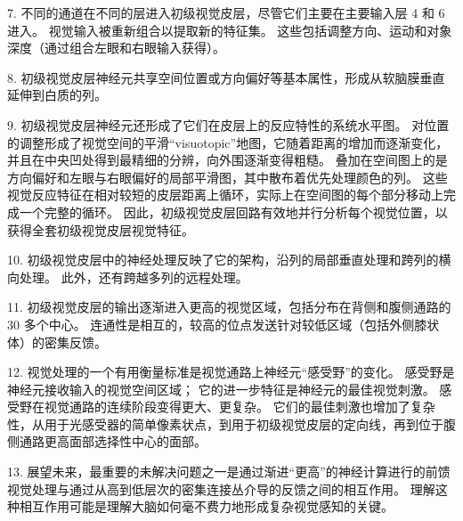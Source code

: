 7. 不同的通道在不同的层进入初级视觉皮层，尽管它们主要在主要输入层 4 和 6 进入。
视觉输入被重新组合以提取新的特征集。
这些包括调整方向、运动和对象深度（通过组合左眼和右眼输入获得）。
 

8. 初级视觉皮层神经元共享空间位置或方向偏好等基本属性，形成从软脑膜垂直延伸到白质的列。
 


9. 初级视觉皮层神经元还形成了它们在皮层上的反应特性的系统水平图。
对位置的调整形成了视觉空间的平滑“visuotopic”地图，它随着距离的增加而逐渐变化，并且在中央凹处得到最精细的分辨，向外围逐渐变得粗糙。
叠加在空间图上的是方向偏好和左眼与右眼偏好的局部平滑图，其中散布着优先处理颜色的列。
这些视觉反应特征在相对较短的皮层距离上循环，实际上在空间图的每个部分移动上完成一个完整的循环。
因此，初级视觉皮层回路有效地并行分析每个视觉位置，以获得全套初级视觉皮层视觉特征。 


10. 初级视觉皮层中的神经处理反映了它的架构，沿列的局部垂直处理和跨列的横向处理。
此外，还有跨越多列的远程处理。


11. 初级视觉皮层的输出逐渐进入更高的视觉区域，包括分布在背侧和腹侧通路的 30 多个中心。
连通性是相互的，较高的位点发送针对较低区域（包括外侧膝状体）的密集反馈。 


12. 视觉处理的一个有用衡量标准是视觉通路上神经元“感受野”的变化。
感受野是神经元接收输入的视觉空间区域；
它的进一步特征是神经元的最佳视觉刺激。
感受野在视觉通路的连续阶段变得更大、更复杂。
它们的最佳刺激也增加了复杂性，从用于光感受器的简单像素状点，到用于初级视觉皮层的定向线，再到位于腹侧通路更高面部选择性中心的面部。


13. 展望未来，最重要的未解决问题之一是通过渐进“更高”的神经计算进行的前馈视觉处理与通过从高到低层次的密集连接丛介导的反馈之间的相互作用。
理解这种相互作用可能是理解大脑如何毫不费力地形成复杂视觉感知的关键。

